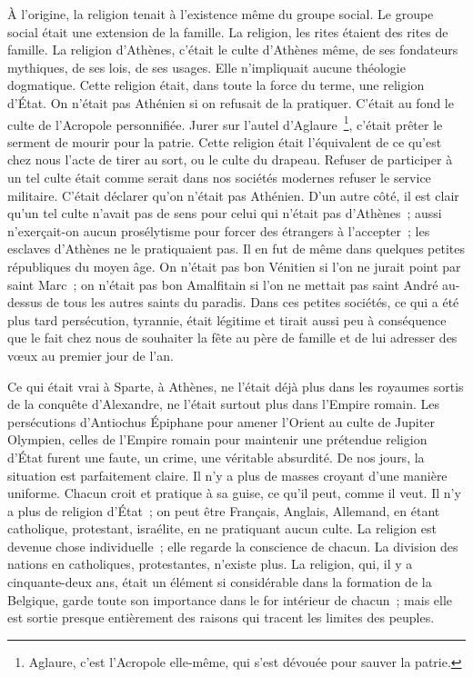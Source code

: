 \documentclass[twoside]{book} %
\newcommand\persName[1]{#1}
\newcommand\placeName[1]{#1}
\begin{document}
\noindent À l’origine, la religion tenait à l’existence même du groupe social. Le groupe social était une extension de la famille. La religion, les rites étaient des rites de famille. La religion d’{\placeName Athènes}, c’était le culte d’{\placeName Athènes} même, de ses fondateurs mythiques, de ses lois, de ses usages. Elle n’impliquait aucune théologie dogmatique. Cette religion était, dans toute la force du terme, une religion d’État. On n’était pas Athénien si on refusait de la pratiquer. C’était au fond le culte de l’Acropole personnifiée. Jurer sur l’autel d’{\persName Aglaure} \footnote{{\persName Aglaure}, c’est l’Acropole elle-même, qui s’est dévouée pour sauver la patrie.}, c’était prêter le serment de mourir pour la patrie. Cette religion était l’équivalent de ce qu’est chez nous l’acte de tirer au sort, ou le culte du drapeau. Refuser de participer à un tel culte était comme serait dans nos sociétés modernes refuser le service militaire. C’était déclarer qu’on n’était pas Athénien. D’un autre côté, il est clair qu’un tel culte n’avait pas de sens pour celui qui n’était pas d’{\placeName Athènes} ; aussi n’exerçait-on aucun prosélytisme pour forcer des étrangers à l’accepter ; les esclaves d’{\placeName Athènes} ne le pratiquaient pas. Il en fut de même dans quelques petites républiques du moyen âge. On n’était pas bon Vénitien si l’on ne jurait point par {\persName saint Marc} ; on n’était pas bon Amalfitain si l’on ne mettait pas {\persName saint André} au-dessus de tous les autres saints du paradis. Dans ces petites sociétés, ce qui a été plus tard persécution, tyrannie, était légitime et tirait aussi peu à conséquence que le fait chez nous de souhaiter la fête au père de famille et de lui adresser des vœux au premier jour de l’an.\par
Ce qui était vrai à {\placeName Sparte}, à {\placeName Athènes}, ne l’était déjà plus dans les royaumes sortis de la conquête d’{\persName Alexandre}, ne l’était surtout plus dans l’{\placeName Empire romain}. Les persécutions d’{\persName Antiochus Épiphane} pour amener l’{\placeName Orient} au culte de {\persName Jupiter Olympien}, celles de l’{\placeName Empire romain} pour maintenir une prétendue religion d’État furent une faute, un crime, une véritable absurdité. De nos jours, la situation est parfaitement claire. Il n’y a plus de masses croyant d’une manière uniforme. Chacun croit et pratique à sa guise, ce qu’il peut, comme il veut. Il n’y a plus de religion d’État ; on peut être Français, Anglais, Allemand, en étant catholique, protestant, israélite, en ne pratiquant aucun culte. La religion est devenue chose individuelle ; elle regarde la conscience de chacun. La division des nations en catholiques, protestantes, n’existe plus. La religion, qui, il y a cinquante-deux ans, était un élément si considérable dans la formation de la {\placeName Belgique}, garde toute son importance dans le for intérieur de chacun ; mais elle est sortie presque entièrement des raisons qui tracent les limites des peuples.
\end{document}
